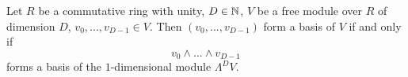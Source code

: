 \begin{proposition}
  Let
    $R$ be a commutative ring with unity,
    $D \in \mathbb{N}$,
    $V$ be a free module over $R$ of dimension $D$,
    $v_0, ..., v_{D - 1} \in V$.
  Then $(v_0, ..., v_{D - 1})$ form a basis of $V$ if and only if
  \begin{equation}
    v_0 \wedge ... \wedge v_{D - 1}
  \end{equation}
  forms a basis of the $1$-dimensional module $\Lambda^D V$.
\end{proposition}
